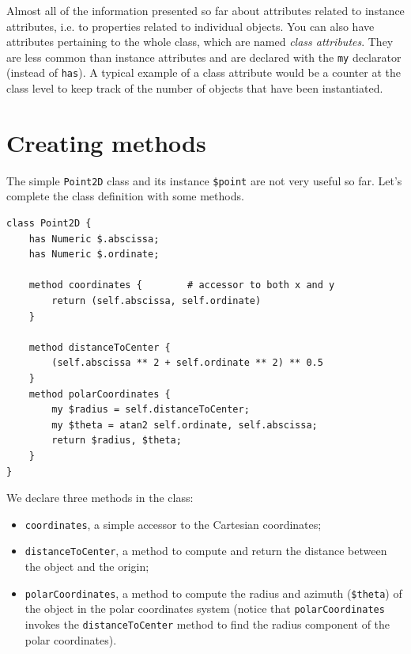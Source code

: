 Almost all of the information presented so far about attributes 
related to instance attributes, i.e. to properties related to 
individual objects. You can also have attributes pertaining 
to the whole class, which are named \emph{class attributes}. 
They are less common than instance attributes and are declared 
with the {\tt my} declarator (instead of {\tt has}). A typical 
example of a class attribute would be a counter at the class level 
to keep track of the number of objects that have been 
instantiated. 


\section{Creating methods}

The simple {\tt Point2D} class and its instance \verb'$point' 
are not very useful so far. Let's complete the class definition 
with some methods.

\begin{verbatim}
class Point2D {
    has Numeric $.abscissa;
    has Numeric $.ordinate;
    
    method coordinates {        # accessor to both x and y
        return (self.abscissa, self.ordinate)
    }
    
    method distanceToCenter {
        (self.abscissa ** 2 + self.ordinate ** 2) ** 0.5
    }
    method polarCoordinates {
        my $radius = self.distanceToCenter;
        my $theta = atan2 self.ordinate, self.abscissa;
        return $radius, $theta;
    }
}
\end{verbatim}

We declare three methods in the class:
\begin{itemize}
\item {\tt coordinates}, a simple accessor to the Cartesian 
coordinates;

\item{\tt distanceToCenter}, a method to compute and return 
the distance between the object and the origin;

\item{\tt polarCoordinates}, a method to compute the radius 
and azimuth (\verb'$theta') of the object in the polar 
coordinates system (notice that {\tt polarCoordinates} 
invokes the {\tt distanceToCenter} method to find the radius 
component of the polar coordinates).
\end{itemize}

